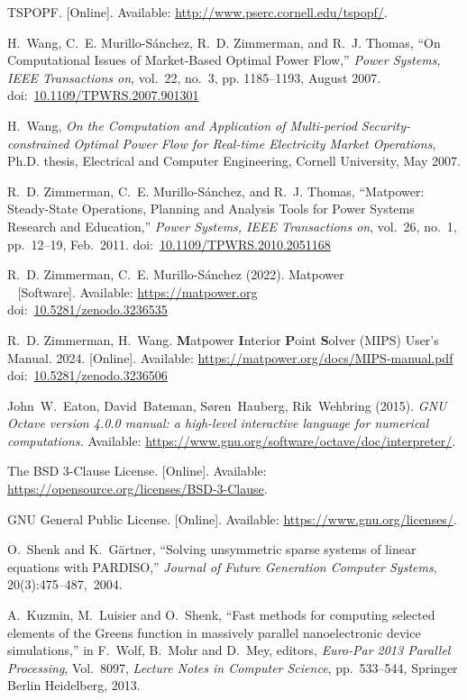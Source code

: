 \documentclass[12pt]{article}
\newcommand{\matpower}[0]{{\sc Matpower}}
\newcommand{\mips}[0]{{MIPS}}
\newcommand{\mipsname}[0]{{{\bf M}{\sc atpower} \textbf{I}nterior \textbf{P}oint \textbf{S}olver}}
\newcommand{\doi}[1]{doi:~\href{https://doi.org/#1}{#1}}
\numberwithin{equation}{section}
\numberwithin{table}{section}
\numberwithin{figure}{section}
\begin{document}
\clearpage
\begin{thebibliography}{99}
TSPOPF. [Online]. Available: \url{http://www.pserc.cornell.edu/tspopf/}.

H.~Wang, C.~E. Murillo-S{\'a}nchez, R.~D. Zimmerman, and R.~J. Thomas, ``On
Computational Issues of Market-Based Optimal Power Flow,'' \emph{Power
Systems, IEEE Transactions on}, vol.~22, no.~3, pp. 1185--1193, August 2007.
\doi{10.1109/TPWRS.2007.901301}

H.~Wang, \emph{On the Computation and Application of Multi-period Security-constrained Optimal Power Flow for Real-time Electricity Market Operations}, Ph.D. thesis, Electrical and Computer Engineering, Cornell University, May 2007.

R.~D. Zimmerman, C.~E. Murillo-S{\'a}nchez, and R.~J. Thomas, ``\matpower{}: Steady-State Operations, Planning and Analysis Tools for Power Systems Research and Education,'' \emph{Power Systems, IEEE Transactions on}, vol.~26, no.~1, pp.~12--19, Feb.~2011.
\doi{10.1109/TPWRS.2010.2051168}

R.~D. Zimmerman, C.~E. Murillo-S{\'a}nchez (2022). \matpower{}\\~
[Software]. Available: \url{https://matpower.org}\\
\doi{10.5281/zenodo.3236535}

R.~D. Zimmerman, H.~Wang. \mipsname{} (\mips{}) User's Manual. 2024.
[Online]. Available: \url{https://matpower.org/docs/MIPS-manual.pdf}\\
\doi{10.5281/zenodo.3236506}

John~W.~Eaton, David~Bateman, S{\o}ren~Hauberg, Rik~Wehbring (2015). \emph{GNU Octave version 4.0.0 manual: a high-level interactive language for numerical computations.} Available: \url{https://www.gnu.org/software/octave/doc/interpreter/}.

The BSD 3-Clause License. [Online]. Available: \url{https://opensource.org/licenses/BSD-3-Clause}.

GNU General Public License. [Online]. Available: \url{https://www.gnu.org/licenses/}.

O.~Shenk and K.~G\"artner, ``Solving unsymmetric sparse systems of linear equations with PARDISO,'' \emph{Journal of Future Generation Computer Systems}, 20(3):475--487,~2004.

A.~Kuzmin, M.~Luisier and O.~Shenk, ``Fast methods for computing selected elements of the Greens function in massively parallel nanoelectronic device simulations,'' in F.~Wolf, B.~Mohr and D.~Mey, editors, \emph{Euro-Par 2013 Parallel Processing}, Vol.~8097, \emph{Lecture Notes in Computer Science}, pp.~533--544, Springer Berlin Heidelberg, 2013.

\end{thebibliography}
\end{document}
